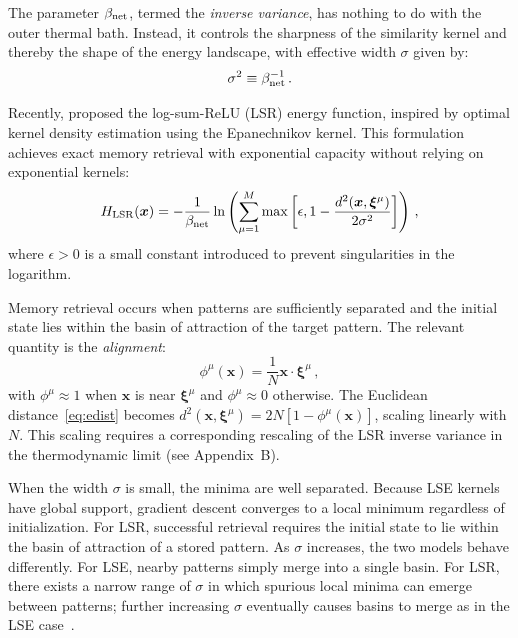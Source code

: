 \documentclass{article}
\theoremstyle{plain}
\theoremstyle{definition}
\theoremstyle{remark}
\begin{document}
The parameter $\beta_{\rm net}$, termed the {\it inverse variance}, has nothing to do with the outer thermal bath. Instead, it controls the sharpness of the similarity kernel and thereby the shape of the energy landscape, with effective width $\sigma$ given by:
\begin{equation}
    \sigma^2 \equiv \beta_{\rm net}^{-1} \,.
\end{equation}

Recently, \citet{hoover2025dense} proposed the log-sum-ReLU (LSR) energy function, inspired by optimal kernel density estimation using the Epanechnikov kernel. This formulation achieves exact memory retrieval with exponential capacity without relying on exponential kernels:
\begin{equation}
    H_{\rm LSR}(\bm{x}) = -\frac{1}{\beta_{\rm net}} \ln \left( \sum_{\mu=1}^M \max\left[\epsilon,  1 - \frac{d^2(\bm{x},\bm{\xi}^\mu)}{2\sigma^2} \right] \right) \,,
    \label{eq:H_lsr}
\end{equation}
where $\epsilon > 0$ is a small constant introduced to prevent singularities in the logarithm.

Memory retrieval occurs when patterns are sufficiently separated and the initial state lies within the basin of attraction of the target pattern. The relevant quantity is the \textit{alignment}:
\begin{equation}
    \phi^\mu(\bm{x}) = \frac{1}{N} \bm{x} \cdot \bm{\xi}^\mu\,,
    \label{eq:alignment}
\end{equation}
with $\phi^\mu \approx 1$ when $\bm{x}$ is near $\bm{\xi}^\mu$ and $\phi^\mu \approx 0$ otherwise. The Euclidean distance~\eqref{eq:edist} becomes $d^2(\bm{x}, \bm{\xi}^\mu) = 2N[1 - \phi^\mu(\bm{x})]$, scaling linearly with $N$. This scaling requires a corresponding rescaling of the LSR inverse variance in the thermodynamic limit (see Appendix~B).

When the width $\sigma$ is small, the minima are well separated. Because LSE kernels have global support, gradient descent converges to a local minimum regardless of initialization. For LSR, successful retrieval requires the initial state to lie within the basin of attraction of a stored pattern. As $\sigma$ increases, the two models behave differently. For LSE, nearby patterns simply merge into a single basin. For LSR, there exists a narrow range of $\sigma$ in which spurious local minima can emerge between patterns; further increasing $\sigma$ eventually causes basins to merge as in the LSE case~\citep{hoover2025dense}.
\end{document}

